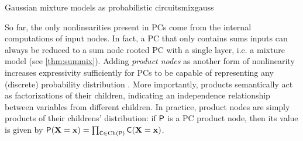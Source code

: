 \begin{example}[sidebyside,lefthand width=0.55\textwidth]{Gaussian mixture models as probabilistic circuits}{mixgauss}
\begin{center}
  \end{center}
\end{example}

So far, the only nonlinearities present in PCs come from the internal computations of input nodes.
In fact, a PC that only contains sums inputs can always be reduced to a sum node rooted PC with a
single layer, i.e. a mixture model (see \cref{thm:summix}). Adding \emph{product nodes} as another
form of nonlinearity increases expressivity sufficiently for PCs to be capable of representing any
(discrete) probability distribution \citep{darwiche03,martens14,peharz15}. More importantly,
products semantically act as factorizations of their children, indicating an independence
relationship between variables from different children. In practice, product nodes are simply
products of their childrens' distribution: if $\operatorname{\textsf{P}}$ is a PC product node, then its value is given
by $\operatorname{\textsf{P}}(\mathbf{X}=\mathbf{x})=\prod_{\operatorname{\textsf{C}}\in\operatorname*{\normalfont{Ch}}(\operatorname{\textsf{P}})}\operatorname{\textsf{C}}(\mathbf{X}=\mathbf{x})$.

